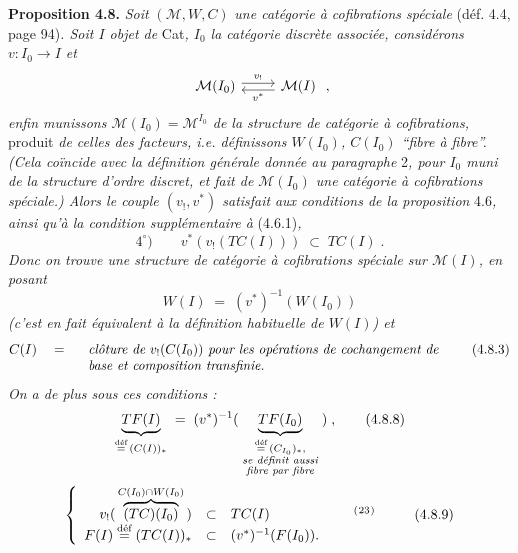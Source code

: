 \textbf{Proposition 4.8.} \textit{Soit} $(\mathcal{M}, W, C)$ \textit{une catégorie à cofibrations spéciale} (déf. 4.4, page 94)\textit{. Soit $I$ objet de} Cat\textit{, $I_0$ la catégorie discrète associée, considérons $v : I_0 \longrightarrow I$ et} %
\[
\begin{tikzcd}
\mathcal{M}(I_0) \arrow[r, shift left, "v_{!}"] & \mathcal{M}(I) \arrow[l, shift left, "v^{*}"]
\end{tikzcd} \; ,
\]
\textit{enfin munissons $\mathcal{M}(I_0) = \mathcal{M}^{I_0}$ de la structure de catégorie à cofibrations,} produit \textit{de celles des facteurs, i.e. définissons $W(I_0)$, $C(I_0)$ “fibre à fibre”. (Cela coïncide avec la définition générale donnée au paragraphe} 2\textit{, pour $I_0$ muni de la structure d'ordre discret, et fait de $\mathcal{M}(I_0)$ une catégorie à cofibrations spéciale.) Alors le couple $(v_{!}, v^{*})$ satisfait}  \textit{aux conditions de la proposition} 4.6\textit{, ainsi qu'à la condition supplémentaire à} (4.6.1)\textit{,}
\[
4^{\circ}) \qquad v^{*}(v_{!}(TC(I))) \;\subset\; TC(I) \; .
\tag*{(4.8.1)}
\]
\textit{Donc on trouve une structure de catégorie à cofibrations spéciale sur $\mathcal{M}(I)$, en posant}
\[
W(I) \;=\; (v^{*})^{-1}(W(I_0))
\tag*{(4.8.2)}
\]
\textit{(c'est en fait équivalent à la définition habituelle de $W(I)$) et}
\[
C(I) \quad = \quad
\begin{array}[t]{l}
\textit{clôture de } v_{!}(C(I_0)) \textit{ pour les opérations de cochangement de}\\
\textit{base et composition transfinie.}
\end{array}
\tag*{(4.8.3)}
\]
\textit{On a de plus sous ces conditions :}
\[
\underbrace{TF(I)}_{\overset{\text{déf}}{=}\,(C(I))_{*}} \;=\; (v^{*})^{-1}( \; \underbrace{TF(I_0)}_{\substack{\overset{\text{déf}}{=}\,(C_{I_0})_{*},\\ \textit{se définit aussi}\\ \textit{fibre par fibre}}} \; ) \; ,
\tag*{(4.8.8)}
\]
\[
\left\{
\begin{array}{rcl}
v_{!}( \, \overbrace{(TC)(I_0)}^{C(I_0)\cap W(I_0)} \, ) & \subset & TC(I) \qquad\qquad\qquad \text{\fnm{23}} \\
F(I) \defeq (TC(I))_{*} & \subset & (v^{*})^{-1}(F(I_0)).
\end{array}
\right.
\tag*{(4.8.9)}
\]


